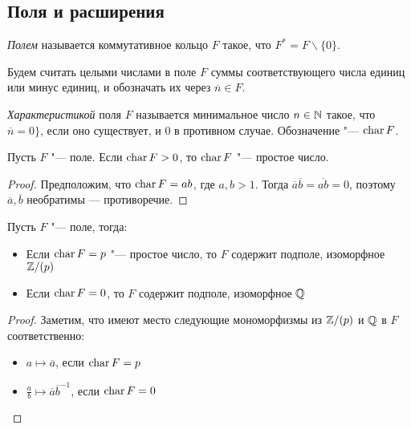 \subsection{Поля и расширения}

\begin{definition}
	\textit{Полем} называется коммутативное кольцо $F$ такое, что $F^* = F \backslash \{0\}$.
\end{definition}

\begin{note}
	Будем считать целыми числами в поле $F$ суммы соответствующего числа единиц или минус единиц, и обозначать их через $\overline{n} \in F$.
\end{note}

\pagebreak

\begin{definition}
	\textit{Характеристикой} поля $F$ называется минимальное число $n \in \mathbb{N}$ такое, что $\overline{n} = 0\}$, если оно существует, и $0$ в противном случае. Обозначение "--- $\operatorname{char}{F}$.
\end{definition}

\begin{proposition}
	Пусть $F$ "--- поле. Если $\operatorname{char}{F} > 0$, то $\operatorname{char}{F}$ "--- простое число.
\end{proposition}

\begin{proof}
	Предположим, что $\operatorname{char}{F} = ab$, где $a, b > 1$. Тогда $\overline{a}\overline{b} = \overline{ab} = 0$, поэтому $\overline{a}, \overline{b}$ необратимы --- противоречие.
\end{proof}

\begin{theorem}
	Пусть $F$ "--- поле, тогда:
	\begin{itemize}
		\item Если $\operatorname{char}{F} = p$ "--- простое число, то $F$ содержит подполе, изоморфное $\mathbb{Z} / (p)$
		\item Если $\operatorname{char}{F} = 0$, то $F$ содержит подполе, изоморфное $\mathbb{Q}$
	\end{itemize}
\end{theorem}

\begin{proof}
	Заметим, что имеют место следующие мономорфизмы из $\mathbb{Z} / (p)$ и $\mathbb{Q}$ в $F$ соответственно:
	\begin{itemize}
		\item $a \mapsto \overline{a}$, если $\operatorname{char}{F} = p$
		\item $\frac{a}{b} \mapsto \overline{a}\overline{b}^{-1}$, если $\operatorname{char}{F} = 0$\qedhere
	\end{itemize}
\end{proof}

